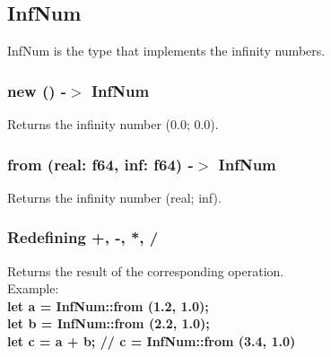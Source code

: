\documentclass[]{article}
\begin{document}
			\subsection{InfNum}
				\Large{InfNum is the type that implements the infinity numbers.}
				\subsubsection{new () -$>$ InfNum}
					Returns the infinity number (0.0; 0.0).
				\subsubsection{from (real: f64, inf: f64) -$>$ InfNum}
					Returns the infinity number (real; inf).
				\subsubsection{Redefining +, -, *, /}
					Returns the result of the corresponding operation.\\Example:\\
					\large{\textbf{let a = InfNum::from (1.2, 1.0);\\
						let b = InfNum::from (2.2, 1.0);\\
						let c = a + b; // c = InfNum::from (3.4, 1.0)}}
\end{document}
